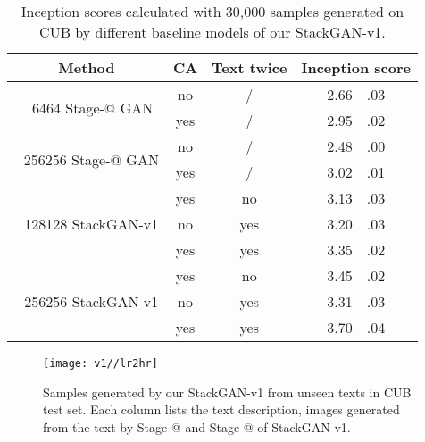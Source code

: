 \documentclass[10pt,journal,letterpaper,compsoc]{IEEEtran}
\makeatletter
\newcommand{\Rmnum}[1]{\expandafter\@slowromancap\romannumeral #1@}
\makeatother
\begin{document}
\begin{table}
\begin{center}
\normalfont
\begin{tabular}{|c|c|c|c|}
\hline
Method &CA &Text twice  &Inception score \\
\hline
\multirow{2}{3cm}{\,\,\,\,\,6464 Stage-\Rmnum{1} GAN}
                                  &no    &/     &2.66~~.03   \\
                                  &yes   &/     &2.95~~.02   \\
\hline
\multirow{2}{3cm}{\,\,\,\,256256 Stage-\Rmnum{1} GAN}
                                  &no    &/     &2.48~~.00   \\
                                  &yes    &/     &3.02~~.01   \\
\hline
\multirow{3}{3cm}{\,\,\,\,128128 StackGAN-v1}
                                  &yes   &no    &3.13~~.03  \\ 
                                  &no    &yes   &3.20~~.03  \\
                                  &yes   &yes   &3.35~~.02  \\
\hline
\multirow{3}{3cm}{\,\,\,\,256256 StackGAN-v1}
                                  &yes   &no    &3.45~~.02  \\ 
                                  &no    &yes   &3.31~~.03  \\
                                  &yes   &yes   &3.70~~.04  \\
\hline
\end{tabular}
\end{center}
\vspace{-5pt}
    \caption{Inception scores calculated with 30,000 samples generated on CUB by different baseline models of our StackGAN-v1.}
\label{tab:inception_score}
\vspace{-5pt}
\end{table}


\begin{figure*}[bt]
\begin{center}
	\texttt{[image: v1//lr2hr]}
\end{center}
\vspace{-8pt}
   \caption{Samples generated by our StackGAN-v1 from unseen texts in CUB test set. 
   Each column lists the text description, images generated from the text by Stage-\Rmnum{1} and Stage-\Rmnum{2} of StackGAN-v1.}
\vspace{-5pt}
\label{fig:lr2hr}
\end{figure*}
\end{document}
